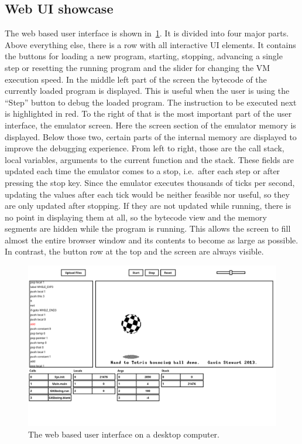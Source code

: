 \subsection{Web UI showcase} \label{ui-showcase}
The web based user interface is shown in~\cref{fig:ui-demo-desktop}. It is divided into four major parts.
Above everything else, there is a row with all interactive UI elements. It contains the buttons for loading a new program, starting, stopping, advancing a single step or resetting the running program and the slider for changing the VM execution speed.
In the middle left part of the screen the bytecode of the currently loaded program is displayed. This is useful when the user is using the ``Step'' button to debug the loaded program. The instruction to be executed next is highlighted in red.
To the right of that is the most important part of the user interface, the emulator screen.
Here the screen section of the emulator memory is displayed.
Below those two, certain parts of the internal memory are displayed to improve the debugging experience. From left to right, those are the call stack, local variables, arguments to the current function and the stack.
These fields are updated each time the emulator comes to a stop, i.e.\ after each step or after pressing the stop key. Since the emulator executes thousands of ticks per second, updating the values after each tick would be neither feasible nor useful, so they are only updated after stopping.
If they are not updated while running, there is no point in displaying them at all, so the bytecode view and the memory segments are hidden while the program is running. This allows the screen to fill almost the entire browser window and its contents to become as large as possible.
In contrast, the button row at the top and the screen are always visible.
\begin{center}
  \begin{figure}[ht]
    \centering
    \includegraphics[width=12cm]{fig/ui-demo-desktop.png}
    \caption{The web based user interface on a desktop computer.}%
    \label{fig:ui-demo-desktop}
  \end{figure}
\end{center}
